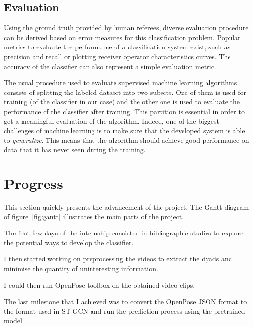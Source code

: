 \documentclass[12pt,a4paper,twoside]{article}
\begin{document}
\subsection{Evaluation}
Using the ground truth provided by human referees, diverse evaluation procedure can be derived based on error measures for this classification problem. Popular metrics to evaluate the performance of a classification system exist, such as precision and recall  or plotting receiver operator characteristics curves. The accuracy of the classifier can also represent a simple evaluation metric.

The usual procedure used to evaluate supervised machine learning algorithms consists of splitting the labeled dataset into two subsets. One of them is used for training (of the classifier in our case) and the other one is used to evaluate the performance of the classifier after training. This partition is essential in order to get a meaningful evaluation of the algorithm. Indeed, one of the biggest challenges of machine learning is to make sure that the developed system is able to \textit{generalize}. This means that the algorithm should achieve good performance on data that it has never seen during the training.

\section{Progress}
This section quickly presents the advancement of the project. The Gantt diagram of figure~\ref{fig:gantt} illustrates the main parts of the project.

The first few days of the internship consisted in bibliographic studies to explore the potential ways to develop the classifier. 

I then started working on preprocessing the videos to extract the dyads and minimise the quantity of uninteresting information. 

I could then run OpenPose toolbox on the obtained video clips. 

The last milestone that I achieved was to convert the OpenPose JSON format to the format used in ST-GCN and run the prediction process using the pretrained model.
\end{document}
